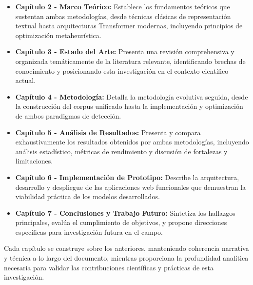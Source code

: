 \begin{itemize}
    \item \textbf{Capítulo 2 - Marco Teórico:} Establece los fundamentos teóricos que sustentan ambas metodologías, desde técnicas clásicas de representación textual hasta arquitecturas Transformer modernas, incluyendo principios de optimización metaheurística.

    \item \textbf{Capítulo 3 - Estado del Arte:} Presenta una revisión comprehensiva y organizada temáticamente de la literatura relevante, identificando brechas de conocimiento y posicionando esta investigación en el contexto científico actual.

    \item \textbf{Capítulo 4 - Metodología:} Detalla la metodología evolutiva seguida, desde la construcción del corpus unificado hasta la implementación y optimización de ambos paradigmas de detección.

    \item \textbf{Capítulo 5 - Análisis de Resultados:} Presenta y compara exhaustivamente los resultados obtenidos por ambas metodologías, incluyendo análisis estadístico, métricas de rendimiento y discusión de fortalezas y limitaciones.

    \item \textbf{Capítulo 6 - Implementación de Prototipo:} Describe la arquitectura, desarrollo y despliegue de las aplicaciones web funcionales que demuestran la viabilidad práctica de los modelos desarrollados.

    \item \textbf{Capítulo 7 - Conclusiones y Trabajo Futuro:} Sintetiza los hallazgos principales, evalúa el cumplimiento de objetivos, y propone direcciones específicas para investigación futura en el campo.
\end{itemize}

Cada capítulo se construye sobre los anteriores, manteniendo coherencia narrativa y técnica a lo largo del documento, mientras proporciona la profundidad analítica necesaria para validar las contribuciones científicas y prácticas de esta investigación.